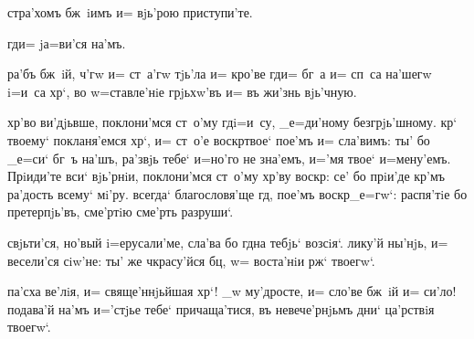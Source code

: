  стра'хомъ бж~iимъ и= вjь'рою приступи'те.

гд и= jа=ви'ся на'мъ.



 ра'бъ бж~iй,  ч'гw и= 
ст~а'гw тjь'ла и= кро'ве гд и= бг~а и= сп~са на'шегw 
i=и~са хр`, во w=ставле'нiе грjьхw'въ и= въ жи'знь 
вjь'чную.





 хр'во ви'дjьвше, поклони'мся ст~о'му 
гд i=и~су, _е=ди'ному безгрjь'шному. кр` твоему` 
покланя'емся хр`, и= ст~о'е воскр твое` пое'мъ 
и= сла'вимъ: ты' бо _е=си` бг~ъ на'шъ, ра'звjь тебе` 
и=но'го не зна'емъ, и='мя твое` и=мену'емъ. Прiиди'те 
вси` вjь'рнiи, поклони'мся ст~о'му хр'ву воскр: 
се' бо прiи'де кр'мъ ра'дость всему` мi'ру. всегда` 
благословя'ще гд, пое'мъ воскр _е=гw`: распя'тiе 
бо претерпjь'въ, сме'ртiю сме'рть разруши`.

 свjьти'ся, но'вый i=ерусали'ме, сла'ва бо 
гд на тебjь` возсiя`. лику'й ны'нjь, и= весели'ся 
сiw'не: ты' же ч красу'йся бц, w= воста'нiи 
рж` твоегw`.

 па'сха ве'лiя, и= свяще'ннjьйшая хр`! _w 
му'дросте, и= сло'ве бж~iй и= си'ло! подава'й на'мъ 
и='стjье тебе` причаща'тися, въ невече'рнjьмъ дни` 
ца'рствiя твоегw`.


